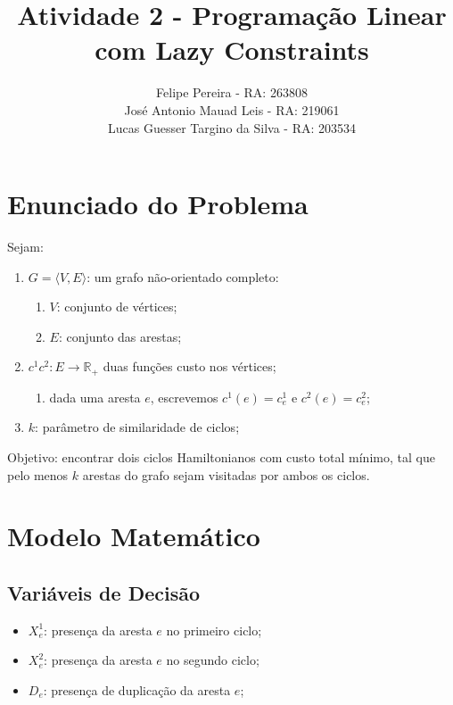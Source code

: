 \documentclass{article}
\title{Atividade 2 - Programação Linear com Lazy Constraints}
\author{
	Felipe Pereira - RA: 263808 \\
	José Antonio Mauad Leis - RA: 219061 \\
	Lucas Guesser Targino da Silva - RA: 203534
}
\newcommand{\edge}{\ensuremath{e}}
\newcommand{\edges}{\ensuremath{E}}
\newcommand{\vertices}{\ensuremath{V}}
\newcommand{\graph}{\ensuremath{G}}
\newcommand{\co}[1]{\ensuremath{c^{1}}}
\newcommand{\ct}{\ensuremath{c^{2}}}
\newcommand{\coe}{\ensuremath{c^{1}_{\edge}}}
\newcommand{\cte}{\ensuremath{c^{2}_{\edge}}}
\newcommand{\positiveReal}{\ensuremath{\mathbb{R}_+}}
\newcommand{\xoe}{\ensuremath{X^{1}_{\edge}}}
\newcommand{\xte}{\ensuremath{X^{2}_{\edge}}}
\newcommand{\de}{\ensuremath{D_{\edge}}}
\newcommand{\similarity}{\ensuremath{k}}
\begin{document}
\maketitle

\section{Enunciado do Problema}

Sejam:

\begin{enumerate}
    \item $\graph = \langle \vertices,\edges \rangle$: um grafo não-orientado completo:
    \begin{enumerate}
        \item $\vertices$: conjunto de vértices;
        \item $\edges$: conjunto das arestas;
    \end{enumerate}
    \item $\co , \ct: \edges \rightarrow \positiveReal$ duas funções custo nos vértices;
        \begin{enumerate}
            \item dada uma aresta $\edge$, escrevemos $c^{1}(\edge) = \coe$ e $\ct(\edge) = \cte$;
        \end{enumerate}
    \item $\similarity$: parâmetro de similaridade de ciclos;
\end{enumerate}

Objetivo: encontrar dois ciclos Hamiltonianos com custo total mínimo, tal que pelo menos $\similarity$ arestas do grafo sejam visitadas por ambos os ciclos.

\section{Modelo Matemático}

\subsection{Variáveis de Decisão}
\label{constraint:variables}

\begin{itemize}
	\item $\xoe$: presença da aresta $\edge$ no primeiro ciclo;
	\item $\xte$: presença da aresta $\edge$ no segundo ciclo;
	\item $\de$: presença de duplicação da aresta $\edge$;
\end{itemize}
\end{document}

